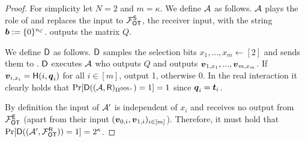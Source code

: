 \begin{proof} \label{proof:Attack_AllOnes}
	For simplicity let $N=2$ and $m=\kappa$. We define $\mathcal{A}$ as follows. $\mathcal{A}$ plays the role of \send and replaces the input to $\mathcal{F}_{\mathsf{OT}}^\mathsf{S}$, the receiver input, with the string $\boldsymbol{b}:=\{0\}^{{n_\mathcal{C}}}$. \Adv outputs the matrix $Q$.
	
	We define $\mathsf D$ as follows. $\mathsf D$ samples the selection bits $x_1,...,x_m\gets[2]$ and sends them to \rec. $\mathsf D$ executes $\mathcal{A}$ who outputs $Q$ and \rec outputs $\boldsymbol{v}_{1,x_1},...,\boldsymbol{v}_{m,x_m}$. If $\boldsymbol{v}_{i,x_i}=\mathsf{H}(i,\boldsymbol{q}_i)$ for all $i\in[m]$, output 1, otherwise 0. In the real interaction it clearly holds that $\Pr[\mathsf D((\mathcal{A}, \mathsf{R})_{\Pi^{\textsf{OOS+}}})=1]=1$ since $\boldsymbol{q}_i=\boldsymbol{t}_i$.
	
	By definition the input of $\mathcal{A}'$ is independent of $x_i$ and receives no output from $\mathcal{F}_{\mathsf{OT}}^\mathsf{E}$ (apart from their input $(\boldsymbol{v}_{0,i},\boldsymbol{v}_{1,i})_{i\in [m]}$). Therefore, it must hold that $\Pr[\mathsf D((\mathcal{A}', \mathcal{F}_{\mathsf{OT}}^\mathsf{R}))=1]=2^{\kappa}$.
	\pe
\end{proof}